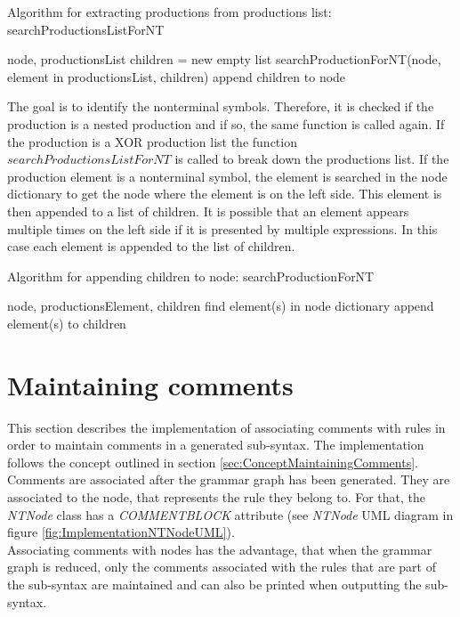 \begin{algorithm}[H]
\caption{Algorithm for extracting productions from productions list: searchProductionsListForNT}
\begin{algorithmic}[1] 
\Require node, productionsList
	\State children = new empty list
	\State searchProductionForNT(node, element in productionsList, children)
	\State append children to node
\EndFor
\end{algorithmic}
\end{algorithm}

The goal is to identify the nonterminal symbols.
Therefore, it is checked if the production is a nested production and if so, the same function is called again.
If the production is a XOR production list the function $searchProductionsListForNT$ is called to break down the productions list.
If the production element is a nonterminal symbol, the element is searched in the node dictionary to get the node where the element is on the left side.
This element is then appended to a list of children. It is possible that an element appears multiple times on the left side if it is presented by multiple expressions.
In this case each element is appended to the list of children.

\begin{algorithm}[H]
\caption{Algorithm for appending children to node: searchProductionForNT}
\begin{algorithmic}[1] 
\Require node, productionsElement, children
		\State find element(s) in node dictionary
		\State append element(s) to children
	\EndIf
\EndFor
\end{algorithmic}
\end{algorithm}

\section{Maintaining comments}\label{sec:ImplementationMaintainingComments}

This section describes the implementation of associating comments with rules in order to maintain comments in a generated sub-syntax.
The implementation follows the concept outlined in section \ref{sec:ConceptMaintainingComments}.
Comments are associated after the grammar graph has been generated.
They are associated to the node, that represents the rule they belong to.
For that, the \textit{NTNode} class has a \textit{COMMENT\textunderscore BLOCK} attribute (see \textit{NTNode} UML diagram in figure \ref{fig:ImplementationNTNodeUML}).\\
Associating comments with nodes has the advantage, that when the grammar graph is reduced, only the comments associated with the rules that are part of the sub-syntax are maintained and can also be printed when outputting the sub-syntax.\\

